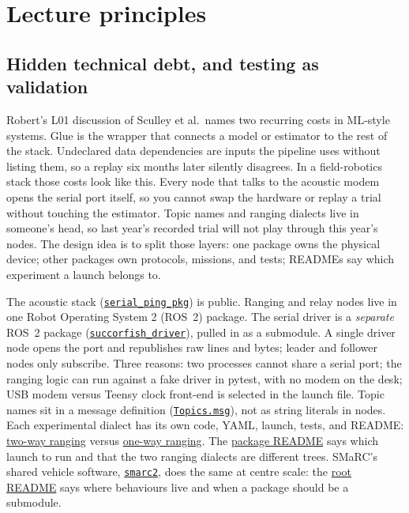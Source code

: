\documentclass[11pt,a4paper,twocolumn]{amsart}
\begin{document}
\section{Lecture principles}
\label{sec:lecture}

\subsection{Hidden technical debt, and testing as validation}
\label{sec:debt}

Robert's L01 discussion of Sculley et al.\ names two recurring costs in ML-style systems. Glue is the wrapper that connects a model or estimator to the rest of the stack. Undeclared data dependencies are inputs the pipeline uses without listing them, so a replay six months later silently disagrees. In a field-robotics stack those costs look like this. Every node that talks to the acoustic modem opens the serial port itself, so you cannot swap the hardware or replay a trial without touching the estimator. Topic names and ranging dialects live in someone's head, so last year's recorded trial will not play through this year's nodes. The design idea is to split those layers: one package owns the physical device; other packages own protocols, missions, and tests; READMEs say which experiment a launch belongs to.

The acoustic stack (\href{https://github.com/NinjaTuna007/serial_ping_pkg}{\texttt{serial\_ping\_pkg}}) is public. Ranging and relay nodes live in one Robot Operating System 2 (ROS~2) package. The serial driver is a \emph{separate} ROS~2 package (\href{https://github.com/NinjaTuna007/succorfish_driver}{\texttt{succorfish\_driver}}), pulled in as a submodule. A single driver node opens the port and republishes raw lines and bytes; leader and follower nodes only subscribe. Three reasons: two processes cannot share a serial port; the ranging logic can run against a fake driver in pytest, with no modem on the desk; USB modem versus Teensy clock front-end is selected in the launch file. Topic names sit in a message definition (\href{https://github.com/NinjaTuna007/succorfish_driver/blob/main/succorfish_msgs/msg/Topics.msg}{\texttt{Topics.msg}}), not as string literals in nodes. Each experimental dialect has its own code, YAML, launch, tests, and README: \href{https://github.com/NinjaTuna007/serial_ping_pkg/blob/main/serial_ping_pkg/serial_ping_pkg/tuper_twtt/README.md}{two-way ranging} versus \href{https://github.com/NinjaTuna007/serial_ping_pkg/blob/main/serial_ping_pkg/serial_ping_pkg/tuper_owtt/README.md}{one-way ranging}. The \href{https://github.com/NinjaTuna007/serial_ping_pkg/blob/main/serial_ping_pkg/README.md}{package README} says which launch to run and that the two ranging dialects are different trees. SMaRC's shared vehicle software, \href{https://github.com/smarc-project/smarc2}{\texttt{smarc2}}, does the same at centre scale: the \href{https://github.com/smarc-project/smarc2/blob/humble/README.md}{root README} says where behaviours live and when a package should be a submodule.
\end{document}
